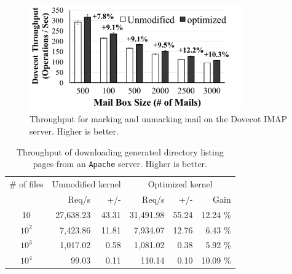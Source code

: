\begin{figure}
\scriptsize
\centering
\includegraphics[width=3.6in]{dcache/plots/dovecot.pdf}
\vspace{-5pt}
\caption[Directory cache optimization: the Dovecot IMAP server throughput.]
{Throughput for marking and unmarking mail on the Dovecot IMAP server. Higher is better. }
\label{fig:dcache:dovecot}
\end{figure}

\begin{table}[t]
\scriptsize
\centering
\begin{tabular}{|c|rr|rrr|}
\hline
\# of files & \multicolumn{2}{c|}{Unmodified kernel} & \multicolumn{3}{c|}{Optimized kernel} \\
& Req/s & +/- & Req/s & +/- & Gain\\
\hline
    10 &     27,638.23 & 43.31 & 31,491.98 & 55.24 & 12.24 \% \\
\hline
$10^2$ &      7,423.86 & 11.81 &  7,934.07 & 12.76 &  6.43 \% \\
\hline
$10^3$ &      1,017.02 &  0.58 &  1,081.02 &  0.38 &  5.92 \% \\
\hline
$10^4$ &         99.03 &  0.11 &    110.14 &  0.10 & 10.09 \% \\
\hline
\end{tabular}
\caption[Directory cache optimization: the Apache server throughput.]
{Throughput of downloading generated directory listing pages from an {\tt Apache} server. Higher is better.}
\label{tab:dcache:apache}
\end{table}

